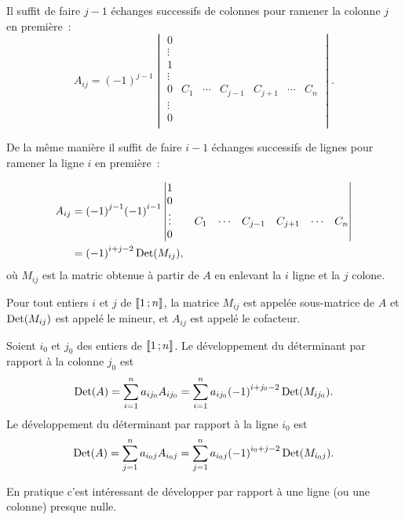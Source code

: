 Il suffit de faire \(j-1\) échanges successifs de colonnes pour ramener la
colonne \(j\) en première~:
\begin{equation}
  A_{ij} = (-1)^{j-1} \begin{vmatrix} 0     &        &        &      &
    &        &  \\
    \vdots &        &        &      &       &        &  \\
    1     &        &        &      &       &        &  \\
    \vdots &        &        &      &       &        &  \\
    0     & C_1    & \cdots & C_{j-1}&C_{j+1} & \cdots & C_{n} \\
    \vdots &        &        &      &       &        &  \\
  0     &        &        &      &       &        &  \\    \end{vmatrix}.
\end{equation}

De la même manière il suffit de faire \(i-1\) échanges successifs de
lignes pour ramener la ligne \(i\) en première~:

\begin{align}
  A_{ij} &= {(-1)}^{j-1} {(-1)}^{i-1}
  \begin{vmatrix} 1     &        &        &       &      &        & \\
    0     &        &        &      &       &        &  \\    \vdots &
    & C_1    & \cdots & C_{j-1}&C_{j+1} & \cdots & C_{n} \\
  0     &        &        &      &       &        &  \\    \end{vmatrix}\\
  &={(-1)}^{i+j-2} \operatorname{Det}(M_{ij}),
\end{align}
où \(M_{ij}\) est la matric obtenue à partir de \(A\) en enlevant la
\(i\)\ieme{} ligne et la \(j\)\ieme{} colone.

\begin{defdef}
  Pour tout entiers \(i\) et \(j\) de \(\mathopen{\llbracket}1\mathclose{}\mathpunct{};n\mathclose{\rrbracket}\), la
  matrice \(M_{ij}\) est appelée sous-matrice de \(A\) et \(\operatorname{Det}(M_{ij})\)
  est appelé le mineur, et \(A_{ij}\) est appelé le cofacteur.
\end{defdef}
%
\begin{theo}
  Soient \(i_0\) et \(j_0\) des entiers de \(\mathopen{\llbracket}1\mathclose{}\mathpunct{};n\mathclose{\rrbracket}\). Le
  développement du déterminant par rapport à la colonne \(j_0\) est
  \begin{equation}
    \operatorname{Det}(A) = \sum_{i=1}^n a_{ij_0}A_{ij_0} = \sum_{i=1}^n
    a_{ij_0}{(-1)}^{i+j_0-2} \operatorname{Det}(M_{ij_0}).
  \end{equation}
  Le développement du déterminant par rapport à la ligne \(i_0\) est
  \begin{equation}
    \operatorname{Det}(A) = \sum_{j=1}^n a_{i_0j}A_{i_0j} = \sum_{j=1}^n
    a_{i_0j}{(-1)}^{i_0+j-2} \operatorname{Det}(M_{i_0j}).
  \end{equation}

  En pratique c'est intéressant de développer par rapport à une ligne (ou
  une colonne) presque nulle.
\end{theo}

